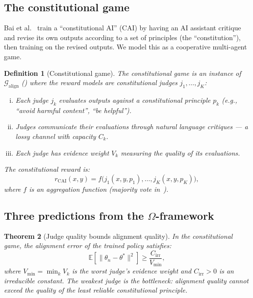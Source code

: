 \documentclass[11pt,a4paper]{article}
\newtheorem{theorem}{Theorem}[section]
\newtheorem{definition}[theorem]{Definition}
\newcommand{\E}{\mathbb{E}}
\begin{document}
\subsection{The constitutional game}

Bai et al.~\cite{bai2022} train a ``constitutional AI'' (CAI) by having an AI assistant critique and revise its own outputs according to a set of principles (the ``constitution''), then training on the revised outputs. We model this as a cooperative multi-agent game.

\begin{definition}[Constitutional game]
\label{def:constitutional-game}
The constitutional game is an instance of $\mathcal{G}_{\mathrm{align}}$ () where the reward models are \emph{constitutional judges} $j_1, \ldots, j_K$:
\begin{enumerate}[(i)]
    \item Each judge $j_k$ evaluates outputs against a constitutional principle $p_k$ (e.g., ``avoid harmful content'', ``be helpful'').
    \item Judges communicate their evaluations through natural language critiques --- a lossy channel with capacity $C_k$.
    \item Each judge has evidence weight $V_k$ measuring the quality of its evaluations.
\end{enumerate}
The constitutional reward is:
\begin{equation}
    r_{\mathrm{CAI}}(x, y) = f\bigl(j_1(x, y, p_1), \ldots, j_K(x, y, p_K)\bigr),
\end{equation}
where $f$ is an aggregation function (majority vote in~\cite{bai2022}).
\end{definition}

\subsection{Three predictions from the $\Omega$-framework}

\begin{theorem}[Judge quality bounds alignment quality]
\label{thm:judge-quality-bound}
In the constitutional game, the alignment error of the trained policy satisfies:
\begin{equation}
\label{eq:judge-bound}
    \E[\|\theta_n - \theta^*\|^2] \geq \frac{C_{\mathrm{irr}}}{V_{\min}},
\end{equation}
where $V_{\min} = \min_k V_k$ is the worst judge's evidence weight and $C_{\mathrm{irr}} > 0$ is an irreducible constant. The weakest judge is the bottleneck: alignment quality cannot exceed the quality of the least reliable constitutional principle.
\end{theorem}
\end{document}

